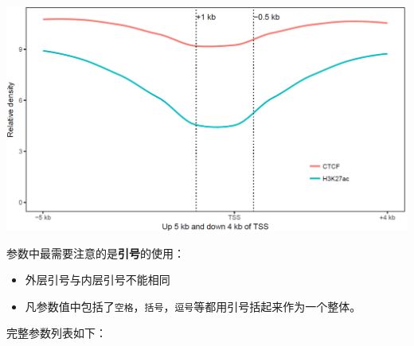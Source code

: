\documentclass[]{article}
\providecommand{\tightlist}{%
  \setlength{\itemsep}{0pt}\setlength{\parskip}{0pt}}
\numberwithin{figure}{section}
\numberwithin{table}{section}
\theoremstyle{definition}
\theoremstyle{definition}
\theoremstyle{definition}
\theoremstyle{remark}
\begin{document}
\begin{center}\includegraphics[width=0.95\linewidth,height=0.7\textheight,keepaspectratio]{images/line_13} \end{center}

参数中最需要注意的是\textbf{引号}的使用：

\begin{itemize}
\tightlist
\item
  外层引号与内层引号不能相同
\item
  凡参数值中包括了\texttt{空格}，\texttt{括号}，\texttt{逗号}等都用引号括起来作为一个整体。
\end{itemize}

完整参数列表如下：
\end{document}
